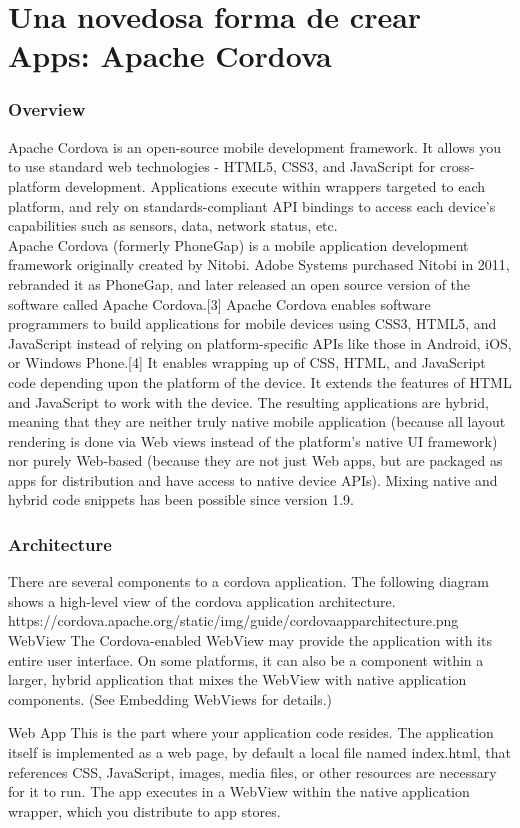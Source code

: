 \chapter{Una novedosa forma de crear Apps: Apache Cordova}
\subsection{Overview}
Apache Cordova is an open-source mobile development framework. It allows you to use standard web technologies - HTML5, CSS3, and JavaScript for cross-platform development. Applications execute within wrappers targeted to each platform, and rely on standards-compliant API bindings to access each device's capabilities such as sensors, data, network status, etc.\\
Apache Cordova (formerly PhoneGap) is a mobile application development framework originally created by Nitobi. Adobe Systems purchased Nitobi in 2011, rebranded it as PhoneGap, and later released an open source version of the software called Apache Cordova.[3] Apache Cordova enables software programmers to build applications for mobile devices using CSS3, HTML5, and JavaScript instead of relying on platform-specific APIs like those in Android, iOS, or Windows Phone.[4] It enables wrapping up of CSS, HTML, and JavaScript code depending upon the platform of the device. It extends the features of HTML and JavaScript to work with the device. The resulting applications are hybrid, meaning that they are neither truly native mobile application (because all layout rendering is done via Web views instead of the platform's native UI framework) nor purely Web-based (because they are not just Web apps, but are packaged as apps for distribution and have access to native device APIs). Mixing native and hybrid code snippets has been possible since version 1.9.
\subsection{Architecture}
There are several components to a cordova application. The following diagram shows a high-level view of the cordova application architecture.
https://cordova.apache.org/static/img/guide/cordovaapparchitecture.png
WebView
The Cordova-enabled WebView may provide the application with its entire user interface. On some platforms, it can also be a component within a larger, hybrid application that mixes the WebView with native application components. (See Embedding WebViews for details.)

Web App
This is the part where your application code resides. The application itself is implemented as a web page, by default a local file named index.html, that references CSS, JavaScript, images, media files, or other resources are necessary for it to run. The app executes in a WebView within the native application wrapper, which you distribute to app stores.

